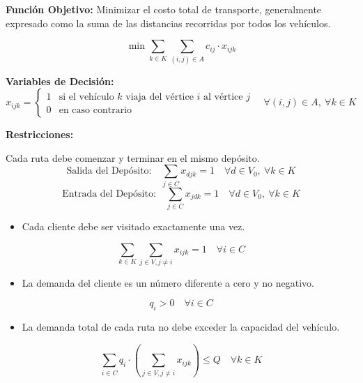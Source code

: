 \noindent\textbf{Funci\'on Objetivo:} Minimizar el costo total de transporte, generalmente expresado como la suma de las distancias recorridas por todos los veh\'iculos.

\begin{equation}
\min \sum_{k \in K}{\sum_{(i,j) \in A}{c_{ij} \cdot x_{ijk}}}
\end{equation}

\noindent\textbf{Variables de Decisi\'on:}
\begin{equation}
x_{ijk} = \left\{ \begin{array}{ll}
1 & \text{si el veh\'iculo } k \text{ viaja del v\'ertice } i \text{ al v\'ertice } j \\
0 & \text{en caso contrario}
\end{array} \right. \quad \forall(i,j) \in A,\ \forall k \in K
\end{equation}

\noindent\textbf{Restricciones:}

Cada ruta debe comenzar y terminar en el mismo dep\'osito.
\begin{equation}
\text{Salida del Dep\'osito:}\quad \sum_{j \in C}{x_{djk}} = 1 \quad \forall d \in V_{0},\ \forall k \in K
\end{equation}
\begin{equation}
\text{Entrada del Dep\'osito:}\quad \sum_{j \in C}{x_{jdk}} = 1 \quad \forall d \in V_{0},\ \forall k \in K
\end{equation}

\begin{itemize}
  \item Cada cliente debe ser visitado exactamente una vez.
\end{itemize}
\begin{equation}
\sum_{k \in K}{\sum_{j \in V, j \neq i}{x_{ijk}}} = 1 \quad \forall i \in C
\end{equation}

\begin{itemize}
  \item La demanda del cliente es un n\'umero diferente a cero y no negativo.
\end{itemize}
\begin{equation}
q_{i} > 0 \quad \forall i \in C
\end{equation}

\begin{itemize}
  \item La demanda total de cada ruta no debe exceder la capacidad del veh\'iculo.
\end{itemize}
\begin{equation}
\sum_{i \in C}{q_{i} \cdot \left( \sum_{j \in V, j \neq i}{x_{ijk}} \right)} \leq Q \quad \forall k \in K
\end{equation}

